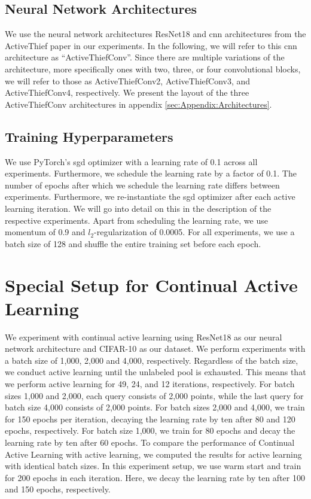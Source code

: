 \subsection{Neural Network Architectures}
\label{sec:ExperimentSetup:NNArchitectures}
We use the neural network architectures ResNet18 \cite{he2016deep} and \gls{cnn} architectures from the ActiveThief paper \cite{pal2020activethief} in our experiments.
In the following, we will refer to this \gls{cnn} architecture as \enquote{ActiveThiefConv}. Since there are multiple variations of the architecture, more specifically
ones with two, three, or four convolutional blocks, we will refer to those as ActiveThiefConv2, ActiveThiefConv3, and ActiveThiefConv4, respectively. We present the
layout of the three ActiveThiefConv architectures in appendix \ref{sec:Appendix:Architectures}.


\subsection{Training Hyperparameters}
\label{sec:ExperimentSetup:Hyperparameters}
We use PyTorch's \gls{sgd} optimizer with a learning rate of 0.1 across all experiments. Furthermore, we schedule the learning rate by a factor of 0.1. The number of
epochs after which we schedule the learning rate differs between experiments. Furthermore, we re-instantiate the \gls{sgd} optimizer after each active learning
iteration. We will go into detail on this in the description of the respective experiments. Apart from scheduling the learning rate, we use momentum \cite{cutkosky2020momentum}
of 0.9 and $l_2$-regularization of 0.0005. For all experiments, we use a batch size of 128 and shuffle the entire training set before each epoch.


\section{Special Setup for Continual Active Learning}
\label{sec:Methodology:CALsetup}
We experiment with continual active learning using ResNet18 as our neural network architecture and CIFAR-10 as our dataset. We perform experiments with a batch size of 1,000,
2,000 and 4,000, respectively. Regardless of the batch size, we conduct active learning until the unlabeled pool is exhausted. This means that we perform active learning for
49, 24, and 12 iterations, respectively. For batch sizes 1,000 and 2,000, each query consists of 2,000 points, while the last query for batch size 4,000 consists of 2,000 points.
For batch sizes 2,000 and 4,000, we train for 150 epochs per iteration, decaying the learning rate by ten after 80 and 120 epochs, respectively. For batch size 1,000, we
train for 80 epochs and decay the learning rate by ten after 60 epochs. To compare the performance of Continual Active Learning with active learning, we computed the results
for active learning with identical batch sizes. In this experiment setup, we use warm start and train for 200 epochs in each iteration. Here, we
decay the learning rate by ten after 100 and 150 epochs, respectively.

